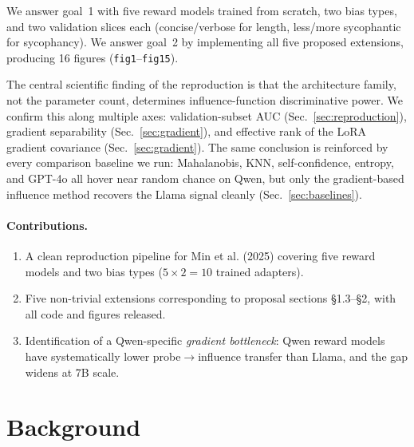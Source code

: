 \documentclass[11pt,a4paper]{article}
\begin{document}
We answer goal~1 with five reward models trained from scratch, two bias types, and two validation
slices each (concise/verbose for length, less/more sycophantic for sycophancy). We answer
goal~2 by implementing all five proposed extensions, producing 16 figures (\texttt{fig1}--\texttt{fig15}).

The central scientific finding of the reproduction is that the architecture family,
not the parameter count, determines influence-function discriminative power. We confirm this
along multiple axes: validation-subset AUC (Sec.~\ref{sec:reproduction}), gradient
separability (Sec.~\ref{sec:gradient}), and effective rank of the LoRA gradient covariance
(Sec.~\ref{sec:gradient}). The same conclusion is reinforced by every comparison
baseline we run: Mahalanobis, KNN, self-confidence, entropy, and GPT-4o all hover near random
chance on Qwen, but only the gradient-based influence method recovers the Llama signal cleanly
(Sec.~\ref{sec:baselines}).

\paragraph{Contributions.}
\begin{enumerate}
    \item A clean reproduction pipeline for Min et al. (2025) covering five reward models and
    two bias types ($5\times2=10$ trained adapters).
    \item Five non-trivial extensions corresponding to proposal sections \S1.3--\S2, with all
    code and figures released.
    \item Identification of a Qwen-specific \emph{gradient bottleneck}: Qwen reward models
    have systematically lower probe$\to$influence transfer than Llama, and the gap widens at
    7B scale.
\end{enumerate}

\section{Background}
\label{sec:background}
\end{document}
